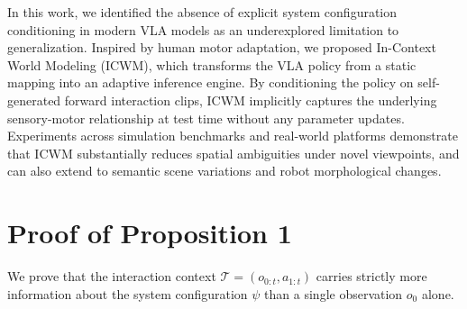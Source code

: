 \documentclass{llmxive}
\providecommand{\contentsname}{Appendix Contents}
\providecommand{\beginappendix}{\appendix{\titlefont \openmossblue{Appendix}\par}}
\begin{document}
In this work, we identified the absence of explicit system configuration conditioning in modern VLA models as an underexplored limitation to generalization. 
Inspired by human motor adaptation, we proposed In-Context World Modeling (ICWM), which transforms the VLA policy from a static mapping into an adaptive inference engine. 
By conditioning the policy on self-generated forward interaction clips, ICWM implicitly captures the underlying sensory-motor relationship at test time without any parameter updates.
Experiments across simulation benchmarks and real-world platforms demonstrate that ICWM substantially reduces spatial ambiguities under novel viewpoints, and can also extend to semantic scene variations and robot morphological changes.






% 



\beginappendix

% 




\section{Proof of Proposition 1}
\label{appendix:proof}

We prove that the interaction context $\mathcal{T} = \left(o_{0:t}, a_{1:t}\right)$ 
carries strictly more information about the system configuration $\psi$ than 
a single observation $o_0$ alone.
\end{document}

